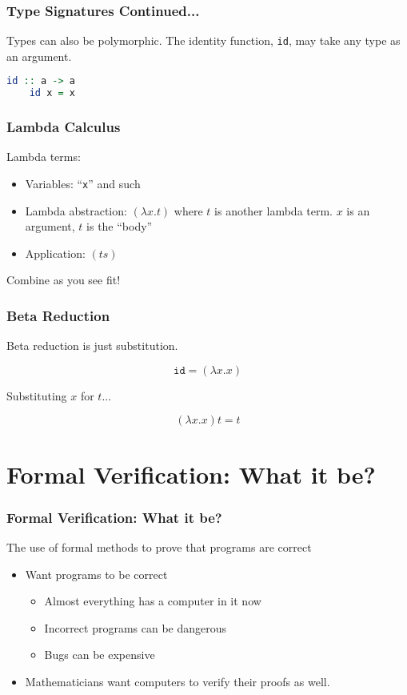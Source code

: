 \documentclass{beamer}
\begin{document}
\begin{frame}[fragile]
  \frametitle{Type Signatures Continued...}

  Types can also be polymorphic. The identity function, \texttt{id}, may take any type as an argument.

  \begin{lstlisting}[frame=single, language=Haskell, breaklines=true]
    id :: a -> a
    id x = x
  \end{lstlisting}
\end{frame}

\begin{frame}[fragile]
  \frametitle{Lambda Calculus}

  Lambda terms:

  \begin{itemize}
  \item Variables: ``\texttt{x}'' and such
  \item Lambda abstraction: $(\lambda x . t)$ where $t$ is another lambda term. $x$ is an argument, $t$ is the ``body''
  \item Application: $(ts)$
  \end{itemize}

  Combine as you see fit!
\end{frame}

\begin{frame}[fragile]
  \frametitle{Beta Reduction}

  Beta reduction is just substitution.

  \[\mathtt{id} = (\lambda x . x)\]

  Substituting $x$ for $t$...

  \[(\lambda x . x) t = t\]
\end{frame}

\section{Formal Verification: What it be?}

\begin{frame}
  \frametitle{Formal Verification: What it be?}

  The use of formal methods to prove that programs are correct

  \begin{itemize}
  \item<2-> Want programs to be correct
    \begin{itemize}
    \item Almost everything has a computer in it now
    \item Incorrect programs can be dangerous
    \item Bugs can be expensive
    \end{itemize}
  \item<3-> Mathematicians want computers to verify their proofs as well.
  \end{itemize}
\end{frame}
\end{document}

